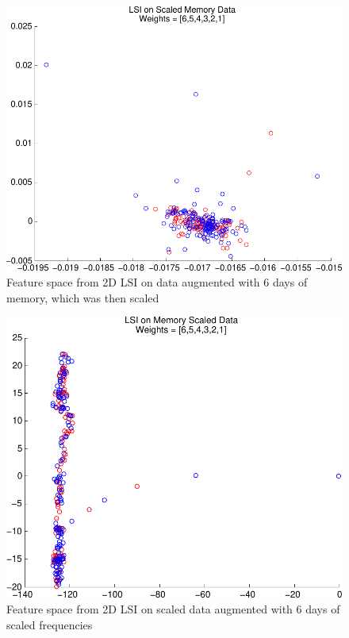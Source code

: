 \documentclass[10pt, twocolumn]{article}
\begin{document}
\begin{figure}
\centering
\includegraphics[scale=0.4]{plots/lsimemscaled.pdf}
\caption{Feature space from 2D LSI on data augmented with 6 days of memory, which was then scaled}
\label{lsimemscaled}
\end{figure}

\begin{figure}
\centering
\includegraphics[scale=0.4]{plots/lsiscaledmem.pdf}
\caption{Feature space from 2D LSI on scaled data augmented with 6 days of scaled frequencies}
\label{lsiscaledmem}
\end{figure}
\end{document}

